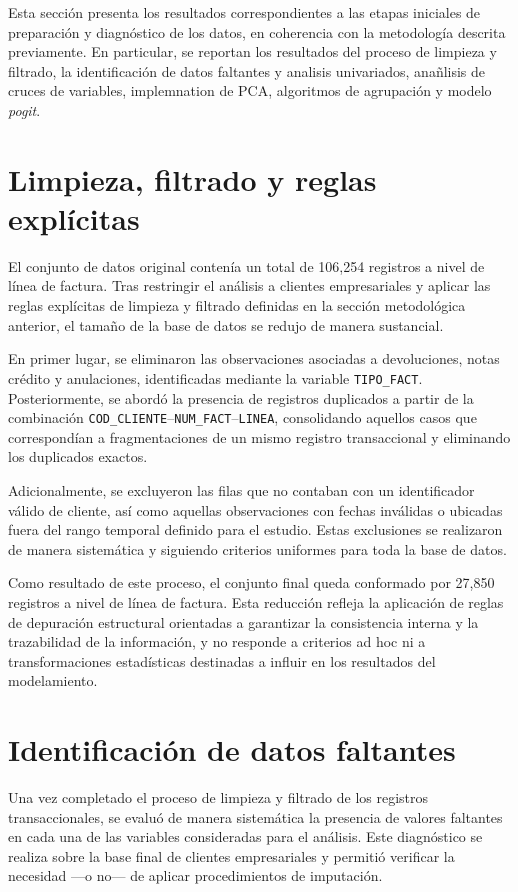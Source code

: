 
Esta sección presenta los resultados correspondientes a las etapas iniciales de preparación y diagnóstico de los datos, en coherencia con la metodología descrita previamente. En particular, se reportan los resultados del proceso de limpieza y filtrado, la identificación de datos faltantes y analisis univariados, anañlisis de cruces de variables, implemnation de PCA, algoritmos de agrupación y modelo \emph{pogit}.

\section{Limpieza, filtrado y reglas explícitas}
    El conjunto de datos original contenía un total de 106{,}254 registros a nivel de línea de factura. Tras restringir el análisis a clientes empresariales y aplicar las reglas explícitas de limpieza y filtrado definidas en la sección metodológica anterior, el tamaño de la base de datos se redujo de manera sustancial.

    En primer lugar, se eliminaron las observaciones asociadas a devoluciones, notas crédito y anulaciones, identificadas mediante la variable \texttt{TIPO\_FACT}. Posteriormente, se abordó la presencia de registros duplicados a partir de la combinación \texttt{COD\_CLIENTE}--\texttt{NUM\_FACT}--\texttt{LINEA}, consolidando aquellos casos que correspondían a fragmentaciones de un mismo registro transaccional y eliminando los duplicados exactos.
    
    Adicionalmente, se excluyeron las filas que no contaban con un identificador válido de cliente, así como aquellas observaciones con fechas inválidas o ubicadas fuera del rango temporal definido para el estudio. Estas exclusiones se realizaron de manera sistemática y siguiendo criterios uniformes para toda la base de datos.
    
    Como resultado de este proceso, el conjunto final queda conformado por 27{,}850 registros a nivel de línea de factura. Esta reducción refleja la aplicación de reglas de depuración estructural orientadas a garantizar la consistencia interna y la trazabilidad de la información, y no responde a criterios ad hoc ni a transformaciones estadísticas destinadas a influir en los resultados del modelamiento.

\section{Identificación de datos faltantes}
    Una vez completado el proceso de limpieza y filtrado de los registros transaccionales, se evaluó de manera sistemática la presencia de valores faltantes en cada una de las variables consideradas para el análisis. Este diagnóstico se realiza sobre la base final de clientes empresariales y permitió verificar la necesidad —o no— de aplicar procedimientos de imputación.

